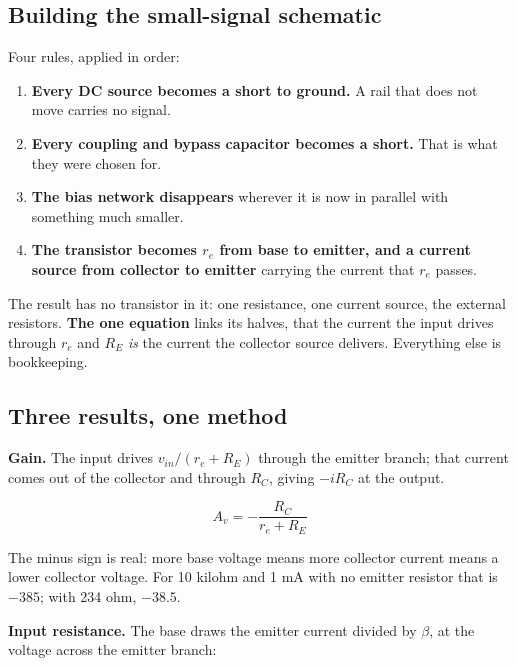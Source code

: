 \subsection{Building the small-signal schematic}
\label{c7:sec:a3}
Four rules, applied in order:

\begin{enumerate}
  \item \textbf{Every DC source becomes a short to ground.} A rail that does not move carries no signal.
  \item \textbf{Every coupling and bypass capacitor becomes a short.} That is what they were chosen for.
  \item \textbf{The bias network disappears} wherever it is now in parallel with something much smaller.
  \item \textbf{The transistor becomes $r_e$ from base to emitter, and a current source from collector to emitter} carrying the current that $r_e$ passes.
\end{enumerate}

The result has no transistor in it: one resistance, one current source, the external resistors. \textbf{The one equation} links its halves, that the current the input drives through $r_e$ and $R_E$ \emph{is} the current the collector source delivers. Everything else is bookkeeping.

\subsection{Three results, one method}
\label{c7:sec:a4}
\textbf{Gain.} The input drives $v_{in}/(r_e + R_E)$ through the emitter branch; that current comes out of the collector and through $R_C$, giving $-i R_C$ at the output.

\[
  A_v = -\frac{R_C}{r_e + R_E}
\]

The minus sign is real: more base voltage means more collector current means a lower collector voltage. For 10 kilohm and 1 mA with no emitter resistor that is $-385$; with 234 ohm, $-38.5$.

\textbf{Input resistance.} The base draws the emitter current divided by $\beta$, at the voltage across the emitter branch:

